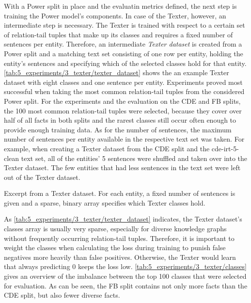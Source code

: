 With a Power split in place and the evaluatin metrics defined, the next step is training the Power model's components. In case of the Texter, however, an intermediate step is necessary. The Texter is trained with respect to a certain set of relation-tail tuples that make up its classes and requires a fixed number of sentences per entity. Therefore, an intermediate \emph{Texter dataset} is created from a Power split and a matching text set consisting of one row per entity, holding the entity's sentences and specifying which of the selected classes hold for that entity. \autoref{tab:5_experiments/3_texter/texter_dataset} shows the an example Texter dataset with eight classes and one sentence per entity. Experiments proved most successful when taking the most common relation-tail tuples from the considered Power split. For the experiments and the evaluation on the CDE and FB splits, the 100 most common relation-tail tuples were selected, because they cover over half of all facts in both splits and the rarest classes still occur often enough to provide enough training data. As for the number of sentences, the maximum number of sentences per entity available in the respective text set was taken. For example, when creating a Texter dataset from the CDE split and the cde-irt-5-clean text set, all of the entities' 5 sentences were shuffled and taken over into the Texter dataset. The few entities that had less sentences in the text set were left out of the Texter dataset.

\begin{table}
    \centering
    
    \caption{Excerpt from a Texter dataset. For each entity, a fixed number of sentences is given and a sparse, binary array specifies which Texter classes hold.}
    \label{tab:5_experiments/3_texter/texter_dataset}
\end{table}

As \autoref{tab:5_experiments/3_texter/texter_dataset} indicates, the Texter dataset's classes array is usually very sparse, especially for diverse knowledge graphs without frequently occurring relation-tail tuples. Therefore, it is important to weight the classes when calculating the loss during training to punish false negatives more heavily than false positives. Otherwise, the Texter would learn that always predicting 0 keeps the loss low. \autoref{tab:5_experiments/3_texter/classes} gives an overview of the imbalance between the top 100 classes that were selected for evaluation. As can be seen, the FB split contains not only more facts than the CDE split, but also fewer diverse facts.

